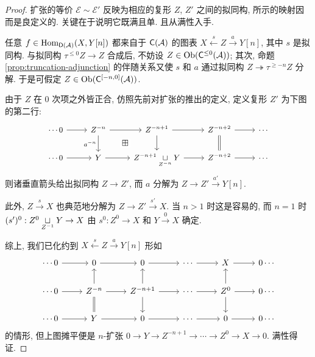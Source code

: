 \begin{proof}
	扩张的等价 $\mathcal{E} \sim \mathcal{E}'$ 反映为相应的复形 $Z$, $Z'$ 之间的拟同构, 所示的映射因而是良定义的. 关键在于说明它既满且单. 且从满性入手.

	任意 $f \in \operatorname{Hom}_{\mathsf{D}(\mathcal{A})}(X, Y[n])$ 都来自于 $\mathsf{C}(\mathcal{A})$ 的图表 $X \xleftarrow{s} Z \xrightarrow{a} Y[n]$, 其中 $s$ 是拟同构. 与拟同构 $\tau^{\leq 0} Z \to Z$ 合成后, 不妨设 $Z \in \operatorname{Ob}(\mathsf{C}^{\leq 0}(\mathcal{A}))$; 其次, 命题 \ref{prop:truncation-adjunction} 的伴随关系又使 $s$ 和 $a$ 通过拟同构 $Z \twoheadrightarrow \tau^{\geq -n} Z$ 分解. 于是可假定 $Z \in \operatorname{Ob}(\mathsf{C}^{[-n, 0]}(\mathcal{A}))$.

	由于 $Z$ 在 $0$ 次项之外皆正合, 仿照先前对扩张的推出的定义, 定义复形 $Z'$ 为下图的第二行:
	\[\begin{tikzcd}[every cell/.append style={font=\small}]
		\cdots 0 \arrow[r] & Z^{-n} \arrow[r] \arrow[d, "{a^{-n}}"'] \arrow[phantom, rd, "\boxplus" description] & Z^{-n+1} \arrow[r] \arrow[d] & Z^{-n+2} \arrow[r] \arrow[equal, d] & \cdots \\
		\cdots 0 \arrow[r] & Y \arrow[r] & Z^{-n+1} \dsqcup{Z^{-n}} Y \arrow[r] & Z^{-n+2} \arrow[r] & \cdots
	\end{tikzcd}\]
	则诸垂直箭头给出拟同构 $Z \to Z'$, 而 $a$ 分解为 $Z \to Z' \xrightarrow{a'} Y[n]$.
	
	此外, $Z \xrightarrow{s} X$ 也典范地分解为 $Z \to Z' \xrightarrow{s'} X$. 当 $n > 1$ 时这是容易的, 而 $n=1$ 时 $(s')^0: Z^0 \underset{Z^{-1}}{\sqcup} Y \to X$ 由 $s^0: Z^0 \to X$ 和 $Y \xrightarrow{0} X$ 确定.

	综上, 我们已化约到 $X \xleftarrow{s} Z \xrightarrow{a} Y[n]$ 形如
	\[\begin{tikzcd}
		\cdots 0 \arrow[r] & 0 \arrow[r] & 0 \arrow[r] & \cdots \arrow[r] & X \arrow[r] & 0 \cdots \\
		\cdots 0 \arrow[r] & Z^{-n} \arrow[r] \arrow[equal, d] \arrow[u] & Z^{-n+1} \arrow[r] \arrow[u] \arrow[d] & \cdots \arrow[r] & Z^0 \arrow[u] \arrow[d] \arrow[r] & 0 \cdots \\
		\cdots 0 \arrow[r] & Y \arrow[r] & 0 \arrow[r] & \cdots \arrow[r] & 0 \arrow[r] & 0 \cdots
	\end{tikzcd}\]
	的情形, 但上图摊平便是 $n$-扩张 $0 \to Y \to Z^{-n+1} \to \cdots \to Z^0 \to X \to 0$. 满性得证.


\end{proof}
